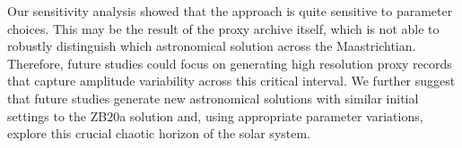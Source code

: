 \documentclass[draft]{agujournal2019}
\begin{document}
Our sensitivity analysis showed that the approach is quite sensitive to parameter choices.
This may be the result of the proxy archive itself, which is not able to robustly distinguish which astronomical solution across the Maastrichtian.
Therefore, future studies could focus on generating high resolution proxy records that capture amplitude variability across this critical interval.
We further suggest that future studies generate new astronomical solutions with similar initial settings to the ZB20a solution and, using appropriate parameter variations, explore this crucial chaotic horizon of the solar system.





%
%
%
%
%
%
%
%
%
%
\end{document}
